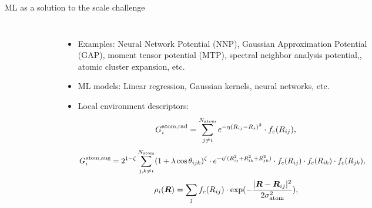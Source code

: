 \documentclass[aspectratio=169]{beamer}
\begin{document}
\begin{frame}{ML as a solution to the scale challenge}
\begin{columns}
    \begin{figure}
        \centering
        \includegraphics[width=\textwidth]{lectures/slides_tex/figures/ML-IAP.jpg}
    \end{figure}
    \begin{itemize}
    \small
        \item Examples: Neural Network Potential (NNP)\cite{behlerHighDimensionalNeuralNetwork}, Gaussian Approximation Potential (GAP)\cite{bartokGaussianApproximationPotentials2010}, moment tensor potential (MTP)\cite{novikovMLIPPackageMoment2021}, spectral neighbor analysis potential,\cite{thompsonSpectralNeighborAnalysis2015}, atomic cluster expansion\cite{drautzAtomicClusterExpansion2020}, etc.
        \item ML models: Linear regression, Gaussian kernels, neural networks, etc.
        \item Local environment descriptors:
        \tiny{
        \begin{equation*}
            G_{i}^{\rm atom, \rm rad} = \sum_{j\neq i}^{N_{\rm atom}} e^{-\eta(R_{ij}-R_{s})^{2}} \cdot f_{c}(R_{ij}),
        \end{equation*}
\begin{equation*}
\begin{split}
    G_{i}^{\rm atom, \rm ang}&=2^{1-\zeta}\sum_{j,k \neq i}^{N_{\rm atom}} (1 + \lambda \cos \theta_{ijk})^{\zeta} \cdot e^{-\eta^{\prime}(R_{ij}^{2}+R_{ik}^{2}+R_{jk}^{2})}
    \cdot f_{c}(R_{ij}) \cdot f_{c}(R_{ik}) \cdot f_{c}(R_{jk}),
\end{split}
\end{equation*}}
\begin{equation*}
    \rho_{i}(\boldsymbol{R}) = \sum_{j} f_{c}(R_{ij}) \cdot \exp(-\frac{|\boldsymbol{R} - \boldsymbol{R}_{ij}|^{2}}{2\sigma_{\rm atom}^{2}}),
\end{equation*}

    \end{itemize}
\end{columns}
    
\end{frame}
\end{document}
